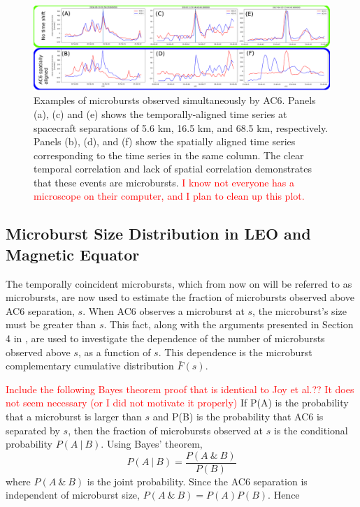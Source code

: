 \documentclass[draft]{agujournal2019}
\begin{document}
\begin{figure}
\includegraphics[width=\textwidth]{fig2.png}
\caption{Examples of microbursts observed simultaneously by AC6. Panels (a), (c) and (e) shows the temporally-aligned time series at spacecraft separations of 5.6 km, 16.5 km, and 68.5 km, respectively. Panels (b), (d), and (f) show the spatially aligned time series corresponding to the time series in the same column. The clear temporal correlation and lack of spatial correlation demonstrates that these events are microbursts. \textcolor{red}{I know not everyone has a microscope on their computer, and I plan to clean up this plot.}} 
\label{fig2}
\end{figure}
	

\subsection{Microburst Size Distribution in LEO and Magnetic Equator}\label{microburst_distribution}
The temporally coincident microbursts, which from now on will be referred to as microbursts, are now used to estimate the fraction of microbursts observed above AC6 separation, $s$. When AC6 observes a microburst at $s$, the microburst's size must be greater than $s$. This fact, along with the arguments presented in Section 4 in , are used to investigate the dependence of the number of microbursts observed above $s$, as a function of $s$. This dependence is the microburst complementary cumulative distribution $\bar{F}(s)$. 

\iffalse
\textcolor{red}{Include the following Bayes theorem proof that is identical to Joy et al.?? It does not seem necessary (or I did not motivate it properly)} If P(A) is the probability that a microburst is larger than $s$ and P(B) is the probability that AC6 is separated by $s$, then the fraction of microbursts observed at $s$ is the conditional probability $P(A \ \vert \ B)$. Using Bayes’ theorem, 
\begin{equation}
P(A \ \vert \ B) = \frac{P(A \ \& \ B)}{P(B)}
\end{equation} where $P(A \ \& \ B)$ is the joint probability. Since the AC6 separation is independent of microburst size, $P(A \ \& \ B) = P(A)P(B)$. Hence
\end{document}
